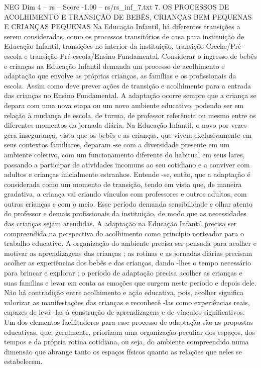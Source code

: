 \begin{textsample}{NEG Dim 4 – rs – Score -1.00 – rs/rs\_inf\_7.txt}  \label{ex:f4_neg_199}
7.
OS PROCESSOS DE ACOLHIMENTO E TRANSIÇÃO DE BEBÊS, CRIANÇAS BEM PEQUENAS E CRIANÇAS PEQUENAS Na Educação Infantil, há diferentes transições a serem consideradas, como os processos transitórios de casa para instituição de Educação Infantil, transições no interior da instituição, transição Creche/Pré-escola e transição Pré-escola/Ensino Fundamental.
Considerar o ingresso de bebês e crianças na Educação Infantil demanda um processo de acolhimento e adaptação que envolve as próprias crianças, as famílias e os profissionais da escola.
Assim como deve prever ações de transição e acolhimento para a entrada das crianças no Ensino Fundamental.
A adaptação ocorre sempre que a criança se depara com uma nova etapa ou um novo ambiente educativo, podendo ser em relação à mudança de escola, de turma, de professor referência ou mesmo entre os diferentes momentos da jornada diária.
Na Educação Infantil, o novo por vezes gera insegurança, visto que os bebês e as crianças, que vivem exclusivamente em seus contextos familiares, deparam -se com a diversidade presente em um ambiente coletivo, com um funcionamento diferente do habitual em seus lares, passando a participar de atividades incomuns ao seu cotidiano e a conviver com adultos e crianças inicialmente estranhos.
Entende -se, então, que a adaptação é considerada como um momento de transição, tendo em vista que, de maneira gradativa, a criança vai criando vínculos com professores e outros adultos, com outras crianças e com o meio.
Esse período demanda sensibilidade e olhar atento do professor e demais profissionais da instituição, de modo que as necessidades das crianças sejam atendidas.
A adaptação na Educação Infantil precisa ser compreendida na perspectiva do acolhimento como princípio norteador para o trabalho educativo.
A organização do ambiente precisa ser pensada para acolher e motivar as aprendizagens das crianças ; as rotinas e as jornadas diárias precisam acolher as experiências dos bebês e das crianças, dando -lhes o tempo necessário para brincar e explorar ; o período de adaptação precisa acolher as crianças e suas famílias e levar em conta as emoções que surgem neste período e depois dele.
Não há contradição entre acolhimento e ação educativa, pois, acolher significa valorizar as manifestações das crianças e reconhecê -las como experiências reais, capazes de levá -las à construção de aprendizagens e de vínculos significativos.
Um dos elementos facilitadores para esse processo de adaptação são as propostas educativas, que, geralmente, priorizam uma organização peculiar dos espaços, dos tempos e da própria rotina cotidiana, ou seja, do ambiente compreendido numa dimensão que abrange tanto os espaços físicos quanto as relações que neles se estabelecem.

\end{textsample}
